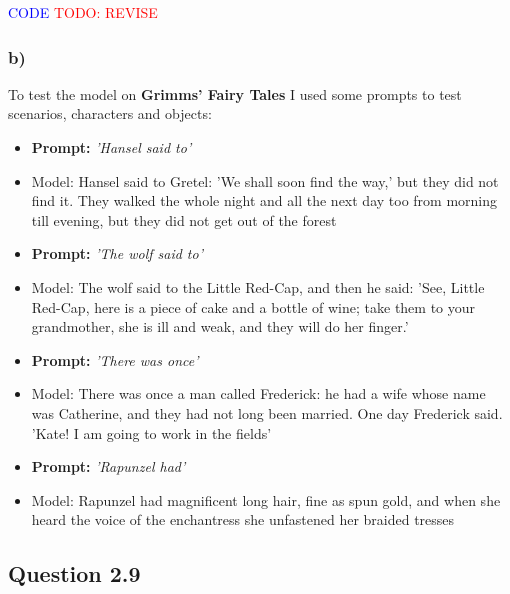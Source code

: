 \documentclass{article}
\begin{document}
\textcolor{blue}{CODE}
\textcolor{red}{TODO: REVISE}

\subsubsection*{b)}

To test the model on \textbf{Grimms' Fairy Tales} I used some prompts to test scenarios, characters and objects: 

\begin{itemize}
    \item \textbf{Prompt:} \textit{'Hansel said to'} 
    \item Model: Hansel said to Gretel: 'We shall soon find the way,' but they did not find it. They walked the whole night and all the next day too from morning till evening, but they did not get out of the forest
\end{itemize}

\begin{itemize}
    \item \textbf{Prompt:} \textit{'The wolf said to'}
    \item Model: The wolf said to the Little Red-Cap, and then he said: 'See, Little Red-Cap, here is a piece
of cake and a bottle of wine; take them to your grandmother, she is ill
and weak, and they will do her finger.'
\end{itemize}

\begin{itemize}
    \item \textbf{Prompt:} \textit{'There was once'}
    \item Model: There was once a man called Frederick: he had a wife whose name was
Catherine, and they had not long been married. One day Frederick said.
'Kate! I am going to work in the fields'
\end{itemize}

\begin{itemize}
    \item \textbf{Prompt:} \textit{'Rapunzel had'}
    \item Model: Rapunzel had magnificent long hair, fine as spun gold, and when she
heard the voice of the enchantress she unfastened her braided tresses
\end{itemize}

\subsection*{Question 2.9}
\end{document}
